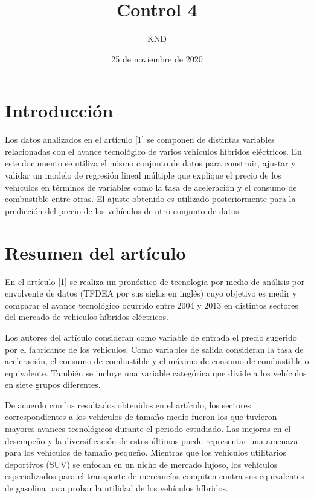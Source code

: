 \documentclass[11pt]{article}
\title{Control 4}
\author{KND}
\date{25 de noviembre de 2020}
\begin{document}
    
    \maketitle
    
    

    
    \hypertarget{introducciuxf3n}{%
\section{Introducción}\label{introducciuxf3n}}

    Los datos analizados en el artículo {[}1{]} se componen de distintas
variables relacionadas con el avance tecnológico de varios vehículos
híbridos eléctricos. En este documento se utiliza el mismo conjunto de
datos para construir, ajustar y validar un modelo de regresión lineal
múltiple que explique el precio de los vehículos en términos de
variables como la tasa de aceleración y el consumo de combustible entre
otras. El ajuste obtenido es utilizado posteriormente para la predicción
del precio de los vehículos de otro conjunto de datos.

    \hypertarget{resumen-del-artuxedculo}{%
\section{Resumen del artículo}\label{resumen-del-artuxedculo}}

    En el artículo {[}1{]} se realiza un pronóstico de tecnología por medio
de análisis por envolvente de datos (TFDEA por sus siglas en inglés)
cuyo objetivo es medir y comparar el avance tecnológico ocurrido entre
2004 y 2013 en distintos sectores del mercado de vehículos híbridos
eléctricos.

Los autores del artículo consideran como variable de entrada el precio
sugerido por el fabricante de los vehículos. Como variables de salida
consideran la tasa de aceleración, el consumo de combustible y el máximo
de consumo de combustible o equivalente. También se incluye una variable
categórica que divide a los vehículos en siete grupos diferentes.

De acuerdo con los resultados obtenidos en el artículo, los sectores
correspondientes a los vehículos de tamaño medio fueron los que tuvieron
mayores avances tecnológicos durante el periodo estudiado. Las mejoras
en el desempeño y la diversificación de estos últimos puede representar
una amenaza para los vehículos de tamaño pequeño. Mientras que los
vehículos utilitarios deportivos (SUV) se enfocan en un nicho de mercado
lujoso, los vehículos especializados para el transporte de mercancías
compiten contra sus equivalentes de gasolina para probar la utilidad de
los vehículos híbridos.
\end{document}
